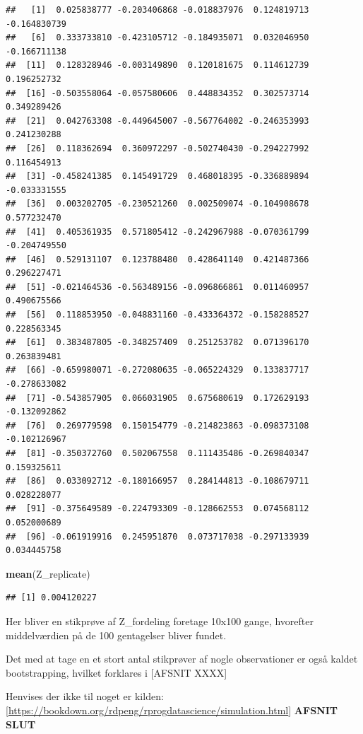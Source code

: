 \documentclass[]{book}
\newenvironment{Shaded}{\begin{snugshade}}{\end{snugshade}}
\newcommand{\KeywordTok}[1]{\textcolor[rgb]{0.13,0.29,0.53}{\textbf{#1}}}
\newcommand{\NormalTok}[1]{#1}
\theoremstyle{definition}
\theoremstyle{definition}
\theoremstyle{definition}
\theoremstyle{remark}
\begin{document}
\begin{verbatim}
##   [1]  0.025838777 -0.203406868 -0.018837976  0.124819713 -0.164830739
##   [6]  0.333733810 -0.423105712 -0.184935071  0.032046950 -0.166711138
##  [11]  0.128328946 -0.003149890  0.120181675  0.114612739  0.196252732
##  [16] -0.503558064 -0.057580606  0.448834352  0.302573714  0.349289426
##  [21]  0.042763308 -0.449645007 -0.567764002 -0.246353993  0.241230288
##  [26]  0.118362694  0.360972297 -0.502740430 -0.294227992  0.116454913
##  [31] -0.458241385  0.145491729  0.468018395 -0.336889894 -0.033331555
##  [36]  0.003202705 -0.230521260  0.002509074 -0.104908678  0.577232470
##  [41]  0.405361935  0.571805412 -0.242967988 -0.070361799 -0.204749550
##  [46]  0.529131107  0.123788480  0.428641140  0.421487366  0.296227471
##  [51] -0.021464536 -0.563489156 -0.096866861  0.011460957  0.490675566
##  [56]  0.118853950 -0.048831160 -0.433364372 -0.158288527  0.228563345
##  [61]  0.383487805 -0.348257409  0.251253782  0.071396170  0.263839481
##  [66] -0.659980071 -0.272080635 -0.065224329  0.133837717 -0.278633082
##  [71] -0.543857905  0.066031905  0.675680619  0.172629193 -0.132092862
##  [76]  0.269779598  0.150154779 -0.214823863 -0.098373108 -0.102126967
##  [81] -0.350372760  0.502067558  0.111435486 -0.269840347  0.159325611
##  [86]  0.033092712 -0.180166957  0.284144813 -0.108679711  0.028228077
##  [91] -0.375649589 -0.224793309 -0.128662553  0.074568112  0.052000689
##  [96] -0.061919916  0.245951870  0.073717038 -0.297133939  0.034445758
\end{verbatim}

\begin{Shaded}
\begin{Highlighting}[]
\KeywordTok{mean}\NormalTok{(Z_replicate)}
\end{Highlighting}
\end{Shaded}

\begin{verbatim}
## [1] 0.004120227
\end{verbatim}

Her bliver en stikprøve af Z\_fordeling foretage 10x100 gange, hvorefter middelværdien på de 100 gentagelser bliver fundet.

Det med at tage en et stort antal stikprøver af nogle observationer er også kaldet bootstrapping, hvilket forklares i {[}AFSNIT XXXX{]}

Henvises der ikke til noget er kilden: {[}\url{https://bookdown.org/rdpeng/rprogdatascience/simulation.html}{]}
\textbf{AFSNIT SLUT}
\end{document}
